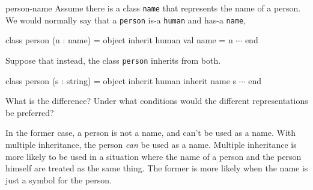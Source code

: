 \exercises

%
\begin{exercise}{person-name}
Assume there is a class \hbox{\lstinline/name/} that represents the
name of a person.  We would normally say that a \hbox{\lstinline/person/} is-a \hbox{\lstinline/human/} and has-a \hbox{\lstinline/name/},

\begin{ocaml}
class person (n : name) = object inherit human val name = n $\cdots$ end
\end{ocaml}
%
Suppose that instead, the class \hbox{\lstinline/person/} inherits from both.

\begin{ocaml}
class person (s : string) =
object
   inherit human
   inherit name s
   $\cdots$
end
\end{ocaml}
%
What is the difference?  Under what conditions would the different
representations be preferred?

\begin{answer}\ifanswers
In the former case, a person is not a name, and can't be used as a
name.  With multiple inheritance, the person \emph{can} be used as a
name.  Multiple inheritance is more likely to be used in a situation
where the name of a person and the person himself are treated as the
same thing.  The former is more likely when the name is just a symbol
for the person.
\fi\end{answer}
\end{exercise}

